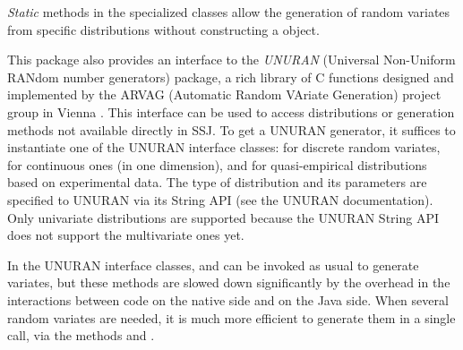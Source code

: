 \emph{Static} methods in the specialized classes allow the generation
of random variates from specific distributions without constructing a
 object.

This package also provides an interface to the
\emph{UNURAN} (Universal Non-Uniform RANdom  number generators) package,
a rich library of C functions designed and
implemented by the ARVAG (Automatic Random VAriate Generation)
project group in Vienna \cite{iLEY02a}.
This interface can be used to access distributions or
generation methods not available directly in SSJ.
To get a UNURAN generator, it suffices to instantiate one
of the UNURAN interface classes:
for discrete random variates,
for continuous ones (in one dimension), and
for quasi-empirical distributions based on experimental data.
The type of distribution and its parameters are specified to
UNURAN via its String API (see the UNURAN documentation).
Only univariate distributions are supported because
the UNURAN String API does not support the multivariate ones yet.

In the UNURAN interface classes,
 and
can be invoked as usual to generate variates,
but these methods are slowed down significantly by the overhead
in the interactions between code on the native side and on the Java side.
When several random variates are needed, it is much more efficient to
generate them in a single call, via the methods
 and
.

